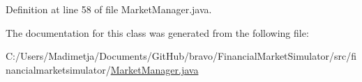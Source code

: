 Definition at line 58 of file Market\+Manager.\+java.



The documentation for this class was generated from the following file\+:\begin{DoxyCompactItemize}
\item 
C\+:/\+Users/\+Madimetja/\+Documents/\+Git\+Hub/bravo/\+Financial\+Market\+Simulator/src/financialmarketsimulator/\hyperlink{_market_manager_8java}{Market\+Manager.\+java}\end{DoxyCompactItemize}
